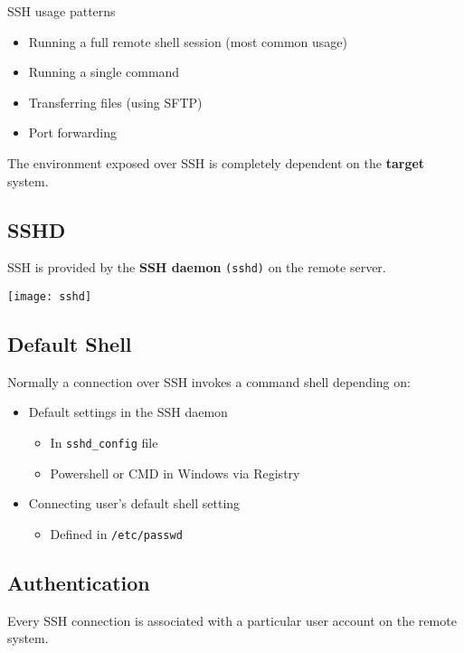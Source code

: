 \documentclass[slides]{pgnotes}
\begin{document}
\begin{greenbox}{SSH usage patterns}
  \begin{itemize}
  \item Running a full remote shell session (most common usage)
  \item Running a single command
  \item Transferring files (using SFTP)
  \item Port forwarding
  \end{itemize}
\end{greenbox}

The environment exposed over SSH is completely dependent on the \textbf{target} system.


\subsection{SSHD}

SSH is provided by the \textbf{SSH daemon} \texttt{(sshd)} on the remote server.

\texttt{[image: sshd]}


\subsection{Default Shell}

Normally a connection over SSH invokes a command shell depending on:
\begin{itemize}
\item Default settings in the SSH daemon
  \begin{itemize}
  \item In \texttt{sshd\_config} file
  \item Powershell or CMD in Windows via Registry
  \end{itemize}
\item Connecting user's default shell setting
  \begin{itemize}
  \item Defined in \texttt{/etc/passwd}
  \end{itemize}
\end{itemize}


\subsection{Authentication}

Every SSH connection is associated with a particular user account on the remote system.
\end{document}
